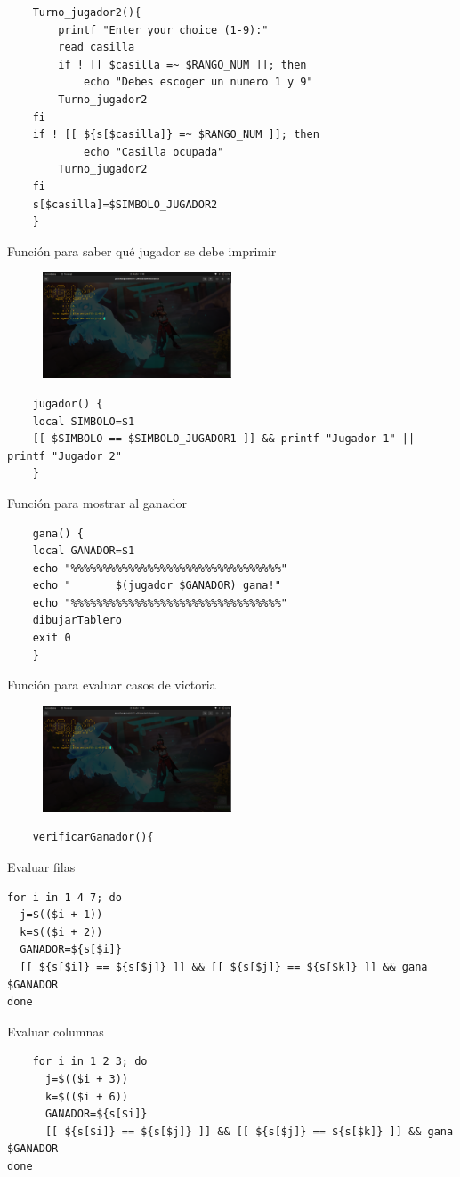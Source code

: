 \documentclass[letterpaper,12pt]{article} %
\begin{document}
\begin{verbatim}
    Turno_jugador2(){
        printf "Enter your choice (1-9):"
        read casilla
        if ! [[ $casilla =~ $RANGO_NUM ]]; then
            echo "Debes escoger un numero 1 y 9"
		Turno_jugador2
	fi
	if ! [[ ${s[$casilla]} =~ $RANGO_NUM ]]; then
            echo "Casilla ocupada"
		Turno_jugador2
	fi
	s[$casilla]=$SIMBOLO_JUGADOR2
    }
\end{verbatim}
    Función para saber qué jugador se debe imprimir

    \begin{figure}[H]
        \centering
        \includegraphics[width=0.5\textwidth]{figurasShell/Jugar5.png}
    \end{figure}
\begin{verbatim}
    jugador() {
	local SIMBOLO=$1
	[[ $SIMBOLO == $SIMBOLO_JUGADOR1 ]] && printf "Jugador 1" || printf "Jugador 2"
    }
\end{verbatim}
    Función para mostrar al ganador
\begin{verbatim}
    gana() {
	local GANADOR=$1
	echo "%%%%%%%%%%%%%%%%%%%%%%%%%%%%%%%%%"
	echo "       $(jugador $GANADOR) gana!"
	echo "%%%%%%%%%%%%%%%%%%%%%%%%%%%%%%%%%"
	dibujarTablero
	exit 0
    }
\end{verbatim}
Función para evaluar casos de victoria

\begin{figure}[H]
    \centering
    \includegraphics[width=0.5\textwidth]{figurasShell/Jugar6.png}
\end{figure}
\begin{verbatim}
    verificarGanador(){
\end{verbatim}
        Evaluar filas
\begin{verbatim}
for i in 1 4 7; do
  j=$(($i + 1))
  k=$(($i + 2))
  GANADOR=${s[$i]}
  [[ ${s[$i]} == ${s[$j]} ]] && [[ ${s[$j]} == ${s[$k]} ]] && gana $GANADOR
done
\end{verbatim}
	Evaluar columnas
\begin{verbatim}
    for i in 1 2 3; do
      j=$(($i + 3))
      k=$(($i + 6))
      GANADOR=${s[$i]}
      [[ ${s[$i]} == ${s[$j]} ]] && [[ ${s[$j]} == ${s[$k]} ]] && gana $GANADOR
done
\end{verbatim}
\end{document}
